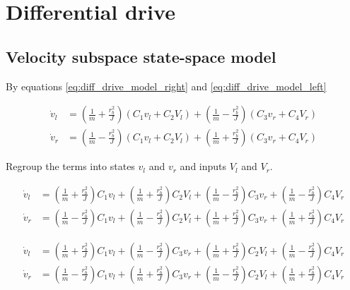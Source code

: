 \section{Differential drive}
\label{sec:ss_model_differential_drive}

\subsection{Velocity subspace state-space model}

By equations \eqref{eq:diff_drive_model_right} and
\eqref{eq:diff_drive_model_left}

\begin{align*}
  \dot{v}_l &= \left(\frac{1}{m} + \frac{r_b^2}{J}\right)
    \left(C_1 v_l + C_2 V_l\right) +
    \left(\frac{1}{m} - \frac{r_b^2}{J}\right) \left(C_3 v_r + C_4 V_r\right) \\
  \dot{v}_r &= \left(\frac{1}{m} - \frac{r_b^2}{J}\right)
    \left(C_1 v_l + C_2 V_l\right) +
    \left(\frac{1}{m} + \frac{r_b^2}{J}\right) \left(C_3 v_r + C_4 V_r\right)
\end{align*}

Regroup the terms into states $v_l$ and $v_r$ and inputs $V_l$ and $V_r$.

\begin{align*}
  \dot{v}_l &= \left(\frac{1}{m} + \frac{r_b^2}{J}\right) C_1 v_l +
    \left(\frac{1}{m} + \frac{r_b^2}{J}\right) C_2 V_l +
    \left(\frac{1}{m} - \frac{r_b^2}{J}\right) C_3 v_r +
    \left(\frac{1}{m} - \frac{r_b^2}{J}\right) C_4 V_r \\
  \dot{v}_r &= \left(\frac{1}{m} - \frac{r_b^2}{J}\right) C_1 v_l +
    \left(\frac{1}{m} - \frac{r_b^2}{J}\right) C_2 V_l +
    \left(\frac{1}{m} + \frac{r_b^2}{J}\right) C_3 v_r +
    \left(\frac{1}{m} + \frac{r_b^2}{J}\right) C_4 V_r
\end{align*}

\begin{align*}
  \dot{v}_l &= \left(\frac{1}{m} + \frac{r_b^2}{J}\right) C_1 v_l +
    \left(\frac{1}{m} - \frac{r_b^2}{J}\right) C_3 v_r +
    \left(\frac{1}{m} + \frac{r_b^2}{J}\right) C_2 V_l +
    \left(\frac{1}{m} - \frac{r_b^2}{J}\right) C_4 V_r \\
  \dot{v}_r &= \left(\frac{1}{m} - \frac{r_b^2}{J}\right) C_1 v_l +
    \left(\frac{1}{m} + \frac{r_b^2}{J}\right) C_3 v_r +
    \left(\frac{1}{m} - \frac{r_b^2}{J}\right) C_2 V_l +
    \left(\frac{1}{m} + \frac{r_b^2}{J}\right) C_4 V_r
\end{align*}

